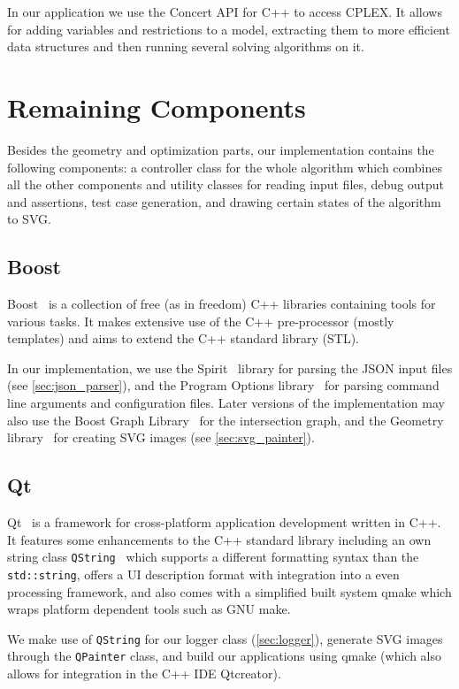 In our application we use the Concert API for C++ \cite{cplex_concert}
to access CPLEX. It allows for adding variables and restrictions to
a model, extracting them to more efficient data structures and then
running several solving algorithms on it.

\section{Remaining Components}
Besides the geometry and optimization parts, our implementation
contains the following components: a controller
class for the whole algorithm which combines all the other components
and utility classes for reading input files, debug
output and assertions, test case generation, and drawing certain 
states of the algorithm to SVG.

\subsection{Boost}
\label{sec:boost}
Boost~\cite{boost} is a collection of free (as in freedom) C++
libraries containing tools for various tasks. It makes extensive use
of the C++ pre-processor (mostly templates) and aims to extend the
C++ standard library (STL).

In our implementation, we use the Spirit~\cite{boost_spirit} library
for parsing the JSON input files (see \cref{sec:json_parser}), and
the Program Options library~\cite{boost_program_options} for parsing
command line arguments and configuration files. Later versions of the
implementation may also use the Boost Graph
Library~\cite{boost_graph} for the intersection graph, and the
Geometry library~\cite{boost_geometry} for creating SVG images
(see \cref{sec:svg_painter}).

\subsection{Qt}
\label{sec:Qt}
Qt~\cite{qt} is a framework for cross-platform application development
written in C++. It features some enhancements to the C++ standard
library including an own string class
\verb|QString|~\cite{qt_manual_qstring} which supports
a different formatting syntax than the \verb|std::string|, offers
a UI description format with integration into a even processing
framework, and also comes with a simplified built system qmake which
wraps platform dependent tools such as GNU make.

We make use of \verb|QString| for our logger class
(\cref{sec:logger}), generate SVG images through the \verb|QPainter|
class, and build our applications using qmake (which also allows
for integration in the C++ IDE Qtcreator).

